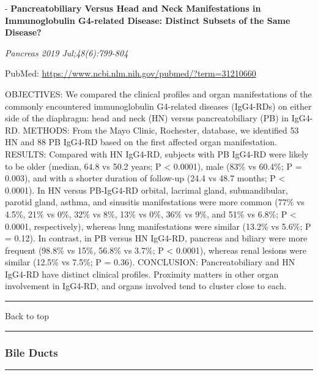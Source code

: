 \documentclass[]{article}
\begin{document}
 - \textbf{Pancreatobiliary Versus Head and Neck Manifestations in
Immunoglobulin G4-related Disease: Distinct Subsets of the Same
Disease?}

\emph{Pancreas 2019 Jul;48(6):799-804}

PubMed: \url{https://www.ncbi.nlm.nih.gov/pubmed/?term=31210660}

OBJECTIVES: We compared the clinical profiles and organ manifestations
of the commonly encountered immunoglobulin G4-related diseases
(IgG4-RDs) on either side of the diaphragm: head and neck (HN) versus
pancreatobiliary (PB) in IgG4-RD. METHODS: From the Mayo Clinic,
Rochester, database, we identified 53 HN and 88 PB IgG4-RD based on the
first affected organ manifestation. RESULTS: Compared with HN IgG4-RD,
subjects with PB IgG4-RD were likely to be older (median, 64.8 vs 50.2
years; P \textless{} 0.0001), male (83\% vs 60.4\%; P = 0.003), and with
a shorter duration of follow-up (24.4 vs 48.7 months; P \textless{}
0.0001). In HN versus PB-IgG4-RD orbital, lacrimal gland, submandibular,
parotid gland, asthma, and sinusitis manifestations were more common
(77\% vs 4.5\%, 21\% vs 0\%, 32\% vs 8\%, 13\% vs 0\%, 36\% vs 9\%, and
51\% vs 6.8\%; P \textless{} 0.0001, respectively), whereas lung
manifestations were similar (13.2\% vs 5.6\%; P = 0.12). In contrast, in
PB versus HN IgG4-RD, pancreas and biliary were more frequent (98.8\% vs
15\%, 56.8\% vs 3.7\%; P \textless{} 0.0001), whereas renal lesions were
similar (12.5\% vs 7.5\%; P = 0.36). CONCLUSION: Pancreatobiliary and HN
IgG4-RD have distinct clinical profiles. Proximity matters in other
organ involvement in IgG4-RD, and organs involved tend to cluster close
to each.

{}

{}

\begin{center}\rule{0.5\linewidth}{\linethickness}\end{center}

Back to top

\begin{center}\rule{0.5\linewidth}{\linethickness}\end{center}

\pagebreak

\hypertarget{bile-ducts}{%
\subsubsection{Bile Ducts}\label{bile-ducts}}

\begin{center}\rule{0.5\linewidth}{\linethickness}\end{center}
\end{document}
